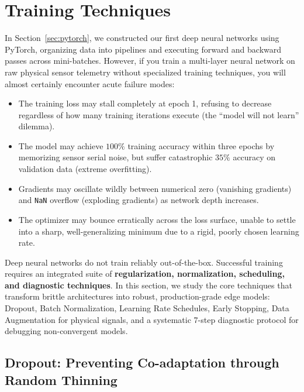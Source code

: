 \section{Training Techniques}\label{sec:training_techniques}

In Section~\ref{sec:pytorch}, we constructed our first deep neural networks using PyTorch, organizing data into pipelines and executing forward and backward passes across mini-batches. However, if you train a multi-layer neural network on raw physical sensor telemetry without specialized training techniques, you will almost certainly encounter acute failure modes:
\begin{itemize}
    \item The training loss may stall completely at epoch 1, refusing to decrease regardless of how many training iterations execute (the ``model will not learn'' dilemma).
    \item The model may achieve $100\%$ training accuracy within three epochs by memorizing sensor serial noise, but suffer catastrophic $35\%$ accuracy on validation data (extreme overfitting).
    \item Gradients may oscillate wildly between numerical zero (vanishing gradients) and \texttt{NaN} overflow (exploding gradients) as network depth increases.
    \item The optimizer may bounce erratically across the loss surface, unable to settle into a sharp, well-generalizing minimum due to a rigid, poorly chosen learning rate.
\end{itemize}

Deep neural networks do not train reliably out-of-the-box. Successful training requires an integrated suite of \textbf{regularization, normalization, scheduling, and diagnostic techniques}. In this section, we study the core techniques that transform brittle architectures into robust, production-grade edge models: Dropout, Batch Normalization, Learning Rate Schedules, Early Stopping, Data Augmentation for physical signals, and a systematic 7-step diagnostic protocol for debugging non-convergent models.

\subsection{Dropout: Preventing Co-adaptation through Random Thinning}\label{subsec:dropout}

